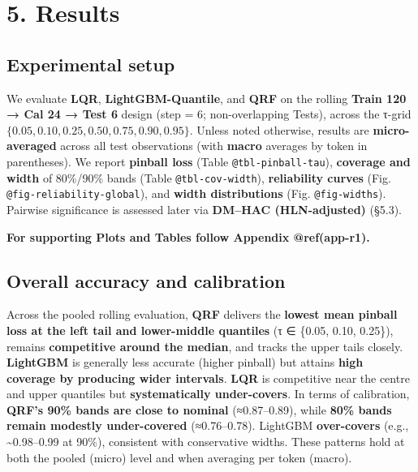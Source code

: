 \documentclass[
  a4paper,
  DIV=11,
  numbers=noendperiod]{scrreprt}
\begin{document}

\chapter{5. Results}\label{results}

\section{Experimental setup}\label{experimental-setup}

We evaluate \textbf{LQR}, \textbf{LightGBM-Quantile}, and \textbf{QRF}
on the rolling \textbf{Train 120 → Cal 24 → Test 6} design (step = 6;
non-overlapping Tests), across the τ-grid
\(\{0.05,0.10,0.25,0.50,0.75,0.90,0.95\}\). Unless noted otherwise,
results are \textbf{micro-averaged} across all test observations (with
\textbf{macro} averages by token in parentheses). We report
\textbf{pinball loss} (Table \texttt{@tbl-pinball-tau}),
\textbf{coverage and width} of 80\%/90\% bands (Table
\texttt{@tbl-cov-width}), \textbf{reliability curves} (Fig.
\texttt{@fig-reliability-global}), and \textbf{width distributions}
(Fig. \texttt{@fig-widths}). Pairwise significance is assessed later via
\textbf{DM--HAC (HLN-adjusted)} (§5.3).

\textbf{For supporting Plots and Tables follow Appendix @ref(app-r1).}

\section{Overall accuracy and
calibration}\label{overall-accuracy-and-calibration}

Across the pooled rolling evaluation, \textbf{QRF} delivers the
\textbf{lowest mean pinball loss at the left tail and lower-middle
quantiles} (τ ∈ \{0.05, 0.10, 0.25\}), remains \textbf{competitive
around the median}, and tracks the upper tails closely.
\textbf{LightGBM} is generally less accurate (higher pinball) but
attains \textbf{high coverage by producing wider intervals}.
\textbf{LQR} is competitive near the centre and upper quantiles but
\textbf{systematically under-covers}. In terms of calibration,
\textbf{QRF's 90\% bands are close to nominal} (≈0.87--0.89), while
\textbf{80\% bands remain modestly under-covered} (≈0.76--0.78).
LightGBM \textbf{over-covers} (e.g., \textasciitilde0.98--0.99 at 90\%),
consistent with conservative widths. These patterns hold at both the
pooled (micro) level and when averaging per token (macro).
\end{document}

